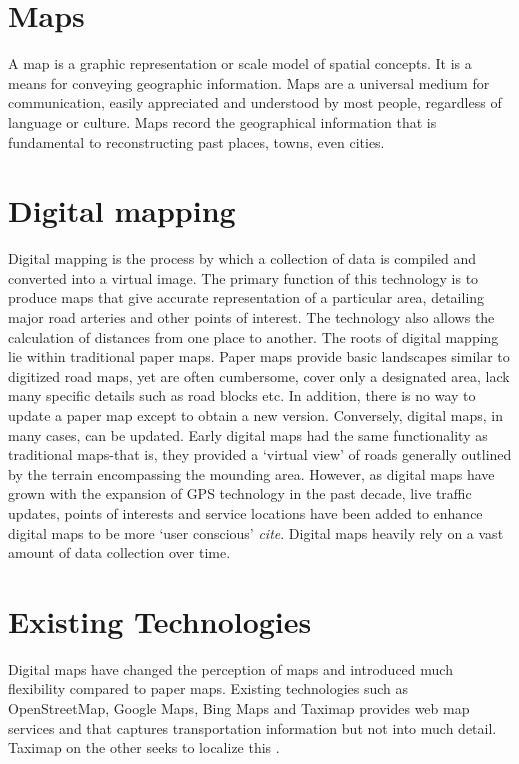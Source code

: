\section{Maps}
A map is a graphic representation or scale model of spatial concepts. It is a means for conveying geographic information. Maps are a universal medium for communication, easily appreciated and understood by most people, regardless of language or culture. Maps record the geographical information that is fundamental to reconstructing past places, towns, even cities.

\section{Digital mapping}
Digital mapping is the process by which a collection of data is compiled and converted into a virtual image. The primary function of this technology is to produce maps that give accurate representation of a particular area, detailing major road arteries and other points of interest. The technology also allows the calculation of distances from one place to another.
The roots of digital mapping lie within traditional paper maps. Paper maps provide basic landscapes similar to digitized road maps, yet are often cumbersome, cover only a designated area, lack many specific details such as road blocks etc. In addition, there is no way to update a paper map except to obtain a new version. Conversely, digital maps, in many cases, can be updated.
Early digital maps had the same functionality as traditional maps-that is, they provided a ‘virtual view’ of roads generally outlined by the terrain encompassing the mounding area. However, as digital maps have grown with the expansion of GPS technology in the past decade, live traffic updates, points of interests and service locations have been added to enhance digital maps to be more ‘user conscious’ \textit{cite}. Digital maps heavily rely on a vast amount of data collection over time.

\section{Existing Technologies}
Digital maps have changed the perception of maps and introduced much flexibility compared to paper maps. Existing technologies such as OpenStreetMap, Google Maps, Bing Maps and Taximap provides web map services and that captures transportation information but not into much detail. Taximap on the other seeks to localize this \citep{vinet2014arch}.

